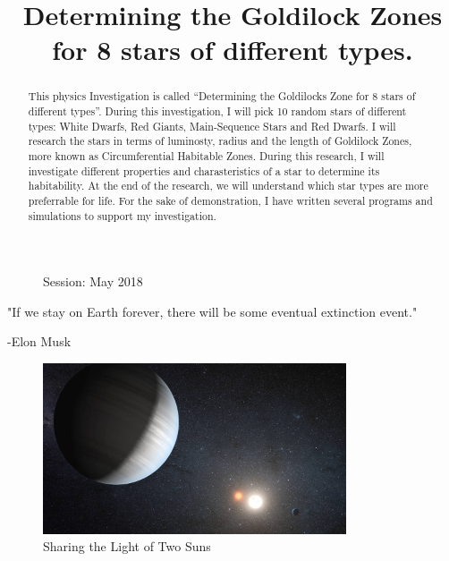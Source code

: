 \documentclass[a4paper,12pt]{article}
\title{Determining the Goldilock Zones for 8 stars of different types.}
\date{}
\author{}
\begin{document}
\maketitle
\tableofcontents

\begin{figure}
  \begin{flushleft}
    Session: May 2018\\
    \end{flushleft}
  \end{figure}

\newpage
{}
\doublespacing

\begin{center}
  "If we stay on Earth forever, there will be some eventual extinction event." 
\end{center}
\begin{flushright}
  -Elon Musk \cite{musk}
\end{flushright}
\onehalfspacing
\begin{abstract}
  This physics Investigation is called ``Determining the Goldilocks Zone for 8 stars of different types''.
  During this investigation, I will pick 10 random stars of different types: White Dwarfs, Red Giants, Main-Sequence Stars and Red Dwarfs.
  I will research the stars in terms of luminosty, radius and the length of Goldilock Zones, more known as Circumferential Habitable Zones.
  During this research, I will investigate different properties and charasteristics of a star to determine its habitability.
  At the end of the research, we will understand which star types are more preferrable for life.
  For the sake of demonstration, I have written several programs and simulations to support my investigation. 
\end{abstract}

\begin{figure}[b!]
  \begin{center}
    \includegraphics[width=0.8\textwidth]{kepler.jpg}
    \caption{Sharing the Light of Two Suns~\cite{kepler}}
  \end{center}
  
\end{figure}
\doublespacing
\end{document}
